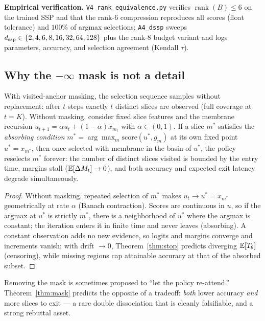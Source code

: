 \noindent\textbf{Empirical verification.} \texttt{V4\_rank\_equivalence.py}
verifies $\operatorname{rank}(B)\le6$ on the trained SSP and that the
rank-6 compression reproduces all scores (float tolerance) and $100\%$ of
argmax selections; \texttt{A4\_dssp} sweeps
$d_{\mathrm{ssp}}\in\{2,4,6,8,16,32,64,128\}$ plus the rank-8 budget variant and
logs parameters, accuracy, and selection agreement (Kendall $\tau$).

\subsection{Why the $-\infty$ mask is not a detail}

\begin{theorem}\label{thm:mask}
With visited-anchor masking, the selection sequence samples without
replacement: after $t$ steps exactly $t$ distinct slices are observed
(full coverage at $t=K$). Without masking, consider fixed slice features
and the membrane recursion $u_{t+1}=\alpha u_t+(1-\alpha)x_{m_t}$ with
$\alpha\in(0,1)$. If a slice $m^\ast$ satisfies the \emph{absorbing
condition} $m^\ast=\arg\max_m \mathrm{score}(u^\ast,g_m)$ at its own fixed
point $u^\ast=x_{m^\ast}$, then once selected with membrane in the basin of
$u^\ast$, the policy reselects $m^\ast$ forever: the number of distinct
slices visited is bounded by the entry time, margins stall
($\mathbb{E}[\Delta M_t]\to0$), and both accuracy and expected exit latency degrade
simultaneously.
\end{theorem}
\begin{proof}
Without masking, repeated selection of $m^\ast$ makes
$u_t\to u^\ast=x_{m^\ast}$ geometrically at rate $\alpha$ (Banach
contraction). Scores are continuous in $u$, so if the argmax at $u^\ast$ is
strictly $m^\ast$, there is a neighborhood of $u^\ast$ where the argmax is
constant; the iteration enters it in finite time and never leaves
(absorbing). A constant observation adds no new evidence, so logits and
margins converge and increments vanish; with drift $\to0$,
Theorem~\ref{thm:stop} predicts diverging $\mathbb{E}[T_\theta]$ (censoring), while
missing regions cap attainable accuracy at that of the absorbed subset.
\end{proof}

\begin{remark}
Removing the mask is sometimes proposed to ``let the policy re-attend.''
Theorem~\ref{thm:mask} predicts the opposite of a tradeoff: \emph{both}
lower accuracy \emph{and} more slices to exit --- a rare double dissociation
that is cleanly falsifiable, and a strong rebuttal asset.
\end{remark}

